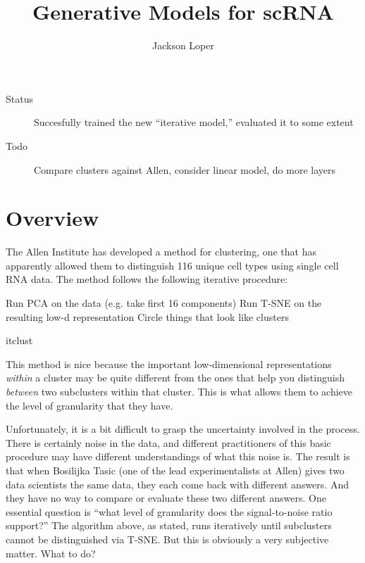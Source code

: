 



\DeclareMathOperator*{\Categorical}{Categorical}


\title{Generative Models for scRNA}
\author{Jackson Loper}

\usepackage{amsthm}
\newtheorem{thm}{Theorem}
\newtheorem{conj}{Conjecture}


\maketitle

\begin{description}
  \item[Status] Succesfully trained the new ``iterative model,'' evaluated it to some extent
  \item[Todo] Compare clusters against Allen, consider linear model, do more layers
\end{description}

\section{Overview}

The Allen Institute has developed a method for clustering, one that has apparently allowed them to distinguish 116 unique cell types using single cell RNA data.  The method follows the following iterative procedure:

\begin{algorithm}[H]
 \vspace{.1in}
  Run PCA on the data (e.g. take first 16 components)\;
  Run T-SNE on the resulting low-d representation\;
  Circle things that look like clusters\;
 \caption{itclust}
\end{algorithm}

This method is nice because the important low-dimensional representations \emph{within} a cluster may be quite different from the ones that help you distinguish \emph{between} two subclusters within that cluster.  This is what allows them to achieve the level of granularity that they have. 

Unfortunately, it is a bit difficult to grasp the uncertainty involved in the process.  There is certainly noise in the data, and different practitioners of this basic procedure may have different understandings of what this noise is.  The result is that when Bosilijka Tasic (one of the lead experimentalists at Allen) gives two data scientists the same data, they each come back with different answers.  And they have no way to compare or evaluate these two different answers.  One essential question is ``what level of granularity does the signal-to-noise ratio support?''  The algorithm above, as stated, runs iteratively until subclusters cannot be distinguished via T-SNE.  But this is obviously a very subjective matter.  What to do?

